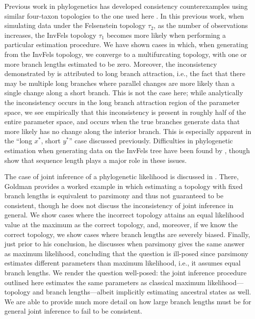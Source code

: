 \documentclass[11pt]{article}
\begin{document}
Previous work in phylogenetics has developed consistency counterexamples using similar four-taxon topologies to the one used here \citep{Felsenstein1978-rr}.
In this previous work, when simulating data under the Felsenstein topology $\tau_2$, as the number of observations increases, the InvFels topology $\tau_1$ becomes more likely when performing a particular estimation procedure.
We have shown cases in which, when generating from the InvFels topology, we converge to a multifurcating topology, with one or more branch lengths estimated to be zero.
Moreover, the inconsistency demonstrated by \citet{Felsenstein1978-rr} is attributed to long branch attraction, i.e., the fact that there may be multiple long branches where parallel changes are more likely than a single change along a short branch.
This is not the case here; while analytically the inconsistency occurs in the long branch attraction region of the parameter space, we see empirically that this inconsistency is present in roughly half of the entire parameter space, and occurs when the true branches generate data that more likely has no change along the interior branch.
This is especially apparent in the ``long $x^*$, short $y^*$'' case discussed previously.
Difficulties in phylogenetic estimation when generating data on the InvFels tree have been found by \citet{Siddall1998-hq}, though \citet{Swofford2001-hr} show that sequence length plays a major role in these issues.

The case of joint inference of a phylogenetic likelihood is discussed in \citet{Goldman1990-dk}.
There, Goldman provides a worked example in which estimating a topology with fixed branch lengths is equivalent to parsimony and thus not guaranteed to be consistent, though he does not discuss the inconsistency of joint inference in general.
We show cases where the incorrect topology attains an equal likelihood value at the maximum as the correct topology, and, moreover, if we know the correct topology, we show cases where branch lengths are severely biased.
Finally, just prior to his conclusion, he discusses when parsimony gives the same answer as maximum likelihood, concluding that the question is ill-posed since parsimony estimates different parameters than maximum likelihood, i.e., it assumes equal branch lengths.
We render the question well-posed: the joint inference procedure outlined here estimates the same parameters as classical maximum likelihood---topology and branch lengths---albeit implicitly estimating ancestral states as well.
We are able to provide much more detail on how large branch lengths must be for general joint inference to fail to be consistent.
\end{document}
